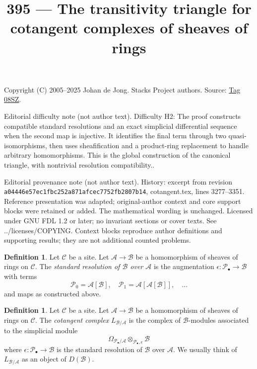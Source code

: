 \documentclass{amsart}
\theoremstyle{plain}
\theoremstyle{definition}
\newtheorem{definition}[subsection]{Definition}
\theoremstyle{remark}
\numberwithin{equation}{subsection}
\begin{document}
\title[Stacks Project, Tag 08SZ]{395 --- The transitivity triangle for cotangent complexes of sheaves of rings}
\maketitle
\noindent Copyright (C) 2005--2025 Johan de Jong. Stacks Project authors. Source: \href{https://stacks.math.columbia.edu/tag/08SZ}{Tag 08SZ}.

\noindent Editorial difficulty note (not author text). Difficulty H2: The proof constructs compatible standard resolutions and an exact simplicial differential sequence when the second map is injective. It identifies the final term through two quasi-isomorphisms, then uses sheafification and a product-ring replacement to handle arbitrary homomorphisms. This is the global construction of the canonical triangle, with nontrivial resolution compatibility..

\noindent Editorial provenance note (not author text). History: excerpt from revision \texttt{a0444\allowbreak 6e57e\allowbreak c1fbc\allowbreak 252a8\allowbreak 71afc\allowbreak ec775\allowbreak 2fb28\allowbreak 07b14}, cotangent.tex, lines 3277--3351. Reference presentation was adapted; original-author context and core support blocks were retained or added. The mathematical wording is unchanged. Licensed under GNU FDL 1.2 or later; no invariant sections or cover texts. See ../licenses/COPYING. Context blocks reproduce author definitions and supporting results; they are not additional counted problems.

\begin{definition}
\label{definition-standard-resolution-sheaves-rings}
Let $\mathcal{C}$ be a site.
Let $\mathcal{A} \to \mathcal{B}$ be a homomorphism of sheaves of rings
on $\mathcal{C}$. The {\it standard resolution of $\mathcal{B}$ over
$\mathcal{A}$} is the augmentation
$\epsilon : \mathcal{P}_\bullet \to \mathcal{B}$
with terms
$$
\mathcal{P}_0 = \mathcal{A}[\mathcal{B}],\quad
\mathcal{P}_1 = \mathcal{A}[\mathcal{A}[\mathcal{B}]],\quad \ldots
$$
and maps as constructed above.
\end{definition}

\begin{definition}
\label{definition-cotangent-complex-morphism-sheaves-rings}
Let $\mathcal{C}$ be a site.
Let $\mathcal{A} \to \mathcal{B}$ be a homomorphism of sheaves of rings
on $\mathcal{C}$.
The {\it cotangent complex} $L_{\mathcal{B}/\mathcal{A}}$
is the complex of $\mathcal{B}$-modules associated to the
simplicial module
$$
\Omega_{\mathcal{P}_\bullet/\mathcal{A}}
\otimes_{\mathcal{P}_\bullet, \epsilon} \mathcal{B}
$$
where $\epsilon : \mathcal{P}_\bullet \to \mathcal{B}$
is the standard resolution of $\mathcal{B}$ over
$\mathcal{A}$. We usually think of $L_{\mathcal{B}/\mathcal{A}}$
as an object of $D(\mathcal{B})$.
\end{definition}
\end{document}
